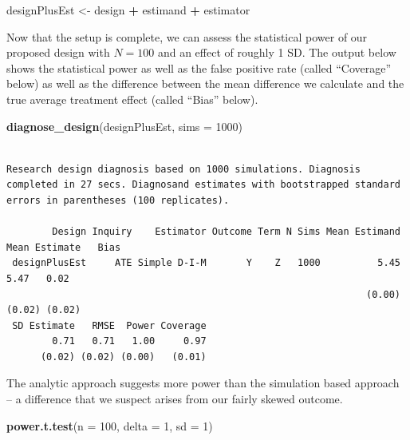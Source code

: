 \documentclass[
  12pt,
]{book}
\newenvironment{Shaded}{\begin{snugshade}}{\end{snugshade}}
\newcommand{\DataTypeTok}[1]{\textcolor[rgb]{0.13,0.29,0.53}{#1}}
\newcommand{\DecValTok}[1]{\textcolor[rgb]{0.00,0.00,0.81}{#1}}
\newcommand{\KeywordTok}[1]{\textcolor[rgb]{0.13,0.29,0.53}{\textbf{#1}}}
\newcommand{\NormalTok}[1]{#1}
\newcommand{\OperatorTok}[1]{\textcolor[rgb]{0.81,0.36,0.00}{\textbf{#1}}}
\newcommand{\StringTok}[1]{\textcolor[rgb]{0.31,0.60,0.02}{#1}}
\theoremstyle{definition}
\theoremstyle{definition}
\theoremstyle{definition}
\theoremstyle{remark}
\begin{document}
\begin{Shaded}
\begin{Highlighting}[]
\NormalTok{designPlusEst <-}\StringTok{ }\NormalTok{design }\OperatorTok{+}\StringTok{ }\NormalTok{estimand }\OperatorTok{+}\StringTok{ }\NormalTok{estimator}
\end{Highlighting}
\end{Shaded}

Now that the setup is complete, we can assess the statistical power of
our proposed design with \(N=100\) and an effect of roughly 1 SD. The
output below shows the statistical power as well as the false positive
rate (called ``Coverage'' below) as well as the difference between the
mean difference we calculate and the true average treatment effect
(called ``Bias'' below).

\begin{Shaded}
\begin{Highlighting}[]
\KeywordTok{diagnose_design}\NormalTok{(designPlusEst, }\DataTypeTok{sims =} \DecValTok{1000}\NormalTok{)}
\end{Highlighting}
\end{Shaded}

\begin{verbatim}

Research design diagnosis based on 1000 simulations. Diagnosis completed in 27 secs. Diagnosand estimates with bootstrapped standard errors in parentheses (100 replicates).

        Design Inquiry    Estimator Outcome Term N Sims Mean Estimand Mean Estimate   Bias
 designPlusEst     ATE Simple D-I-M       Y    Z   1000          5.45          5.47   0.02
                                                               (0.00)        (0.02) (0.02)
 SD Estimate   RMSE  Power Coverage
        0.71   0.71   1.00     0.97
      (0.02) (0.02) (0.00)   (0.01)
\end{verbatim}

The analytic approach suggests more power than the simulation based
approach -- a difference that we suspect arises from our fairly skewed
outcome.

\begin{Shaded}
\begin{Highlighting}[]
\KeywordTok{power.t.test}\NormalTok{(}\DataTypeTok{n =} \DecValTok{100}\NormalTok{, }\DataTypeTok{delta =} \DecValTok{1}\NormalTok{, }\DataTypeTok{sd =} \DecValTok{1}\NormalTok{)}
\end{Highlighting}
\end{Shaded}
\end{document}
